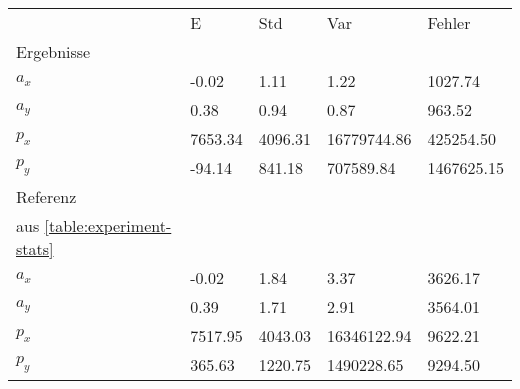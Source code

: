 \begin{tabular}{l|l|l|l|l}

     & E   & Std    & Var    & Fehler \\
\hhline{=|=|=|=|=}

Ergebnisse & & & & \\
$a_x$  &        -0.02 &         1.11 &         1.22 &      1027.74 \\
$a_y$  &         0.38 &         0.94 &         0.87 &       963.52 \\
$p_x$  &      7653.34 &      4096.31 &  16779744.86 &    425254.50 \\
$p_y$  &       -94.14 &       841.18 &    707589.84 &   1467625.15 \\

\hline
Referenz & & & & \\
aus \ref{table:experiment-stats} & & & & \\
$a_x$  &        -0.02 &         1.84 &         3.37 &      3626.17 \\
$a_y$  &         0.39 &         1.71 &         2.91 &      3564.01 \\
$p_x$  &      7517.95 &      4043.03 &  16346122.94 &      9622.21 \\
$p_y$  &       365.63 &      1220.75 &   1490228.65 &      9294.50 \\
\end{tabular}
